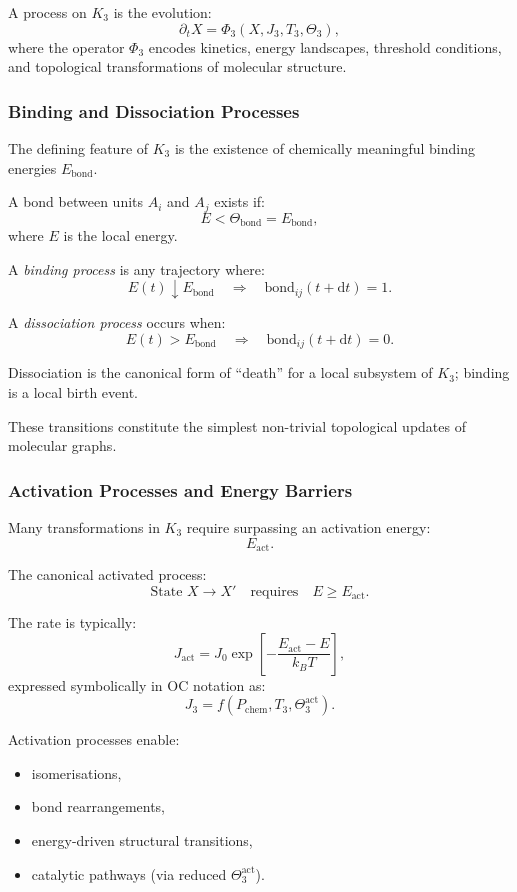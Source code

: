 A process on $K_3$ is the evolution:
\[
\partial_t X = \Phi_3(X, J_3, T_3, \Theta_3),
\]
where the operator $\Phi_3$ encodes kinetics, energy landscapes,
threshold conditions, and topological transformations of molecular
structure.

\subsubsection{Binding and Dissociation Processes}

The defining feature of $K_3$ is the existence of chemically meaningful
binding energies $E_{\text{bond}}$.

A bond between units $A_i$ and $A_j$ exists if:
\[
E < \Theta_{\text{bond}} = E_{\text{bond}},
\]
where $E$ is the local energy.

A \emph{binding process} is any trajectory where:
\[
E(t) \downarrow E_{\text{bond}} \quad \Rightarrow \quad \text{bond}_{ij}(t+\mathrm{d}t)=1.
\]

A \emph{dissociation process} occurs when:
\[
E(t) > E_{\text{bond}} \quad \Rightarrow \quad \text{bond}_{ij}(t+\mathrm{d}t)=0.
\]

Dissociation is the canonical form of ``death'' for a local subsystem of
$K_3$; binding is a local birth event.

These transitions constitute the simplest non-trivial topological
updates of molecular graphs.

\subsubsection{Activation Processes and Energy Barriers}

Many transformations in $K_3$ require surpassing an activation energy:
\[
E_{\text{act}}.
\]

The canonical activated process:
\[
\text{State } X \to X' \quad \text{requires} \quad E \ge E_{\text{act}}.
\]

The rate is typically:
\[
J_{\text{act}} = J_0 \exp\!\left[-\frac{E_{\text{act}}-E}{k_BT}\right],
\]
expressed symbolically in OC notation as:
\[
J_3 = f(P_\text{chem}, T_3, \Theta_3^{\text{act}}).
\]

Activation processes enable:
\begin{itemize}
    \item isomerisations,
    \item bond rearrangements,
    \item energy-driven structural transitions,
    \item catalytic pathways (via reduced $\Theta_3^{\text{act}}$).
\end{itemize}

